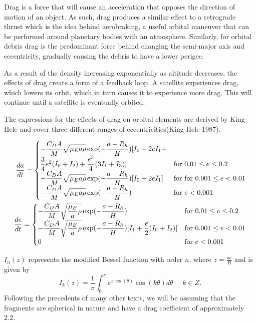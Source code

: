 \documentclass{article}
\begin{document}
Drag is a force that will cause an acceleration that opposes the direction of motion of an object. As such, drag produces a similar effect to a retrograde thrust which is the idea behind aerobraking, a useful orbital maneuver that can be performed around planetary bodies with an atmosphere. Similarly, for orbital debris drag is the predominant force behind changing the semi-major axis and eccentricity, gradually causing the debris to have a lower perigee. 

As a result of the density increasing exponentially as altitude decreases, the effects of drag create a form of a feedback loop. A satellite experiences drag, which lowers its orbit, which in turn causes it to experience more drag. This will continue until a satellite is eventually orbited. 

The expressions for the effects of drag on orbital elements are derived by King-Hele and cover three different ranges of eccentricities(King-Hele 1987).

\begin{align}
		\dfrac{da}{dt} = \begin{cases}
			-\dfrac{C_D A}{M} \sqrt{\mathstrut\mu_E a \rho} \exp(-\dfrac{a - R_h}{H})[I_0 
			+ 2eI_1 + \\ \dfrac{3}{4}e^2(I_0 + I_2) + \dfrac{e^3}{4}(3I_1 +I_3)] & \text{for } 0.01 \leq e \leq 0.2 \\
			-\dfrac{C_D A}{M} \sqrt{\mathstrut\mu_E a \rho}\exp(-\dfrac{a - R_h}{H})[I_0 + 2eI_1 ] & \text{for } \text{for } 0.001 \leq e < 0.01\\
			-\dfrac{C_D A}{M} \sqrt{\mathstrut\mu_E a \rho}\exp(-\dfrac{a - R_h}{H}) & \text{for } e < 0.001
		\end{cases}\\
		\newline
		\dfrac{de}{dt} = \begin{cases}
			-\dfrac{C_D A}{M} \sqrt{\mathstrut\dfrac{\mu_E}{a} \rho}\exp(-\dfrac{a - R_h}{H}) & \text{for } 0.01 \leq e \leq 0.2  \\
			-\dfrac{C_D A}{M} \sqrt{\mathstrut\dfrac{\mu_E}{a} \rho}\exp(-\dfrac{a - R_h}{H})[I_1 + \dfrac{e}{2}(I_0 + I_2)] & \text{for } 0.001 \leq e < 0.01\\
			0 & \text{for } e < 0.001
		\end{cases}
	\end{align}

$I_n(z)$ represents the modified Bessel function with order $n$, where $z = \frac{ae}{H}$ and is given by
$$
I_k(z) = \dfrac{1}{\pi} \int_{0}^{\pi} e^{z\cos(\theta)}\cos(k\theta)d\theta \:\:\:\:\:\: k \in Z.
$$
Following the precedents of many other texts, we will be assuming that the fragments are spherical in nature and have a drag coefficient of approximately 2.2.
\end{document}
